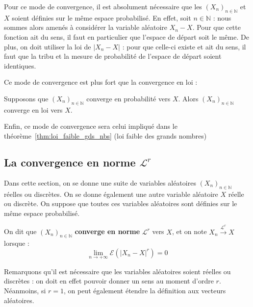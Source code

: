 \documentclass[../integ-proba.tex]{subfiles}
\begin{document}
    \begin{rem}
        Pour ce mode de convergence, il est absolument nécessaire que les $\left(X_n\right)_{n\in\mathbb{N}}$ et $X$ soient définies sur le même espace probabilisé.
        En effet, soit $n \in \mathbb{N}$ : nous sommes alors amenés à considérer la variable aléatoire $X_n - X$.
        Pour que cette fonction ait du sens, il faut en particulier que l'espace de départ soit le même.
        De plus, on doit utiliser la loi de $\left|X_n - X\right|$ : pour que celle-ci existe et ait du sens, il faut que la tribu et la mesure de probabilité de l'espace de départ soient identiques.
    \end{rem}

    Ce mode de convergence est plus fort que la convergence en loi :

    \begin{prop}
        Supposons que $\left(X_n\right)_{n\in\mathbb{N}}$ converge en probabilité vers $X$.
        Alors $\left(X_n\right)_{n\in\mathbb{N}}$ converge en loi vers $X$.
    \end{prop}

    \begin{rem}
        Enfin, ce mode de convergence sera celui impliqué dans le théorème~\ref{thm:loi_faible_gds_nbs} (loi faible des grands nombres)
    \end{rem}

    \subsection{La convergence en norme $\mathcal{L}^r$}

    Dans cette section, on se donne une suite de variables aléatoires $\left(X_n\right)_{n\in\mathbb{N}}$ réelles ou discrètes.
    On se donne également une autre variable aléatoire $X$ réelle ou discrète.
    On suppose que toutes ces variables aléatoires sont définies sur le même espace probabilisé.

    \begin{defi}
        On dit que $\left(X_n\right)_{n\in\mathbb{N}}$ \textbf{converge en norme} $\mathcal{L}^r$ vers $X$, et on note $X_n \xrightarrow[]{\mathcal{L}^r} X$ lorsque :
        \begin{displaymath}
            \lim_{n \to +\infty}\mathcal{E}\left(\left|X_n - X\right|^r\right) = 0
        \end{displaymath}
    \end{defi}

    \begin{rem}
        Remarquons qu'il est nécessaire que les variables aléatoires soient réelles ou discrètes : on doit en effet pouvoir donner un sens au moment d'ordre $r$.
        Néanmoins, si $r=1$, on peut également étendre la définition aux vecteurs aléatoires.
    \end{rem}
\end{document}
